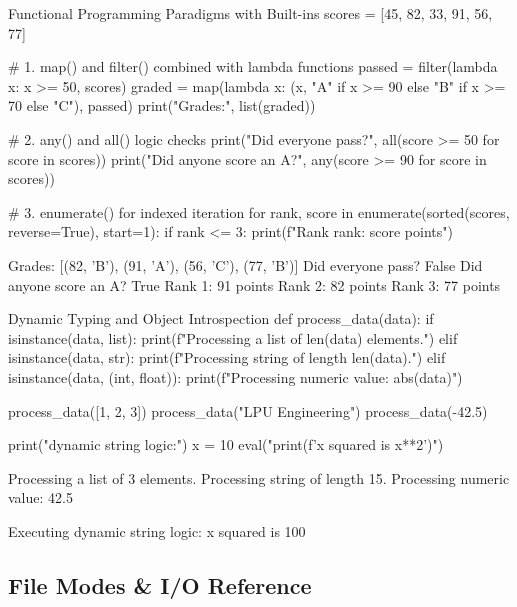 \begin{pythoncode}[]{Functional Programming Paradigms with Built-ins}
scores = [45, 82, 33, 91, 56, 77]

# 1. map() and filter() combined with lambda functions
passed = filter(lambda x: x >= 50, scores)
graded = map(lambda x: (x, "A" if x >= 90 else "B" if x >= 70 else "C"), passed)
print("Grades:", list(graded))

# 2. any() and all() logic checks
print("Did everyone pass?", all(score >= 50 for score in scores))
print("Did anyone score an A?", any(score >= 90 for score in scores))

# 3. enumerate() for indexed iteration
for rank, score in enumerate(sorted(scores, reverse=True), start=1):
    if rank <= 3:
        print(f"Rank {rank}: {score} points")
\end{pythoncode}
\begin{outputbox}
Grades: [(82, 'B'), (91, 'A'), (56, 'C'), (77, 'B')]
Did everyone pass? False
Did anyone score an A? True
Rank 1: 91 points
Rank 2: 82 points
Rank 3: 77 points
\end{outputbox}

\begin{pythoncode}[]{Dynamic Typing and Object Introspection}
def process_data(data):
    if isinstance(data, list):
        print(f"Processing a list of {len(data)} elements.")
    elif isinstance(data, str):
        print(f"Processing string of length {len(data)}.")
    elif isinstance(data, (int, float)):
        print(f"Processing numeric value: {abs(data)}")

process_data([1, 2, 3])
process_data("LPU Engineering")
process_data(-42.5)

print("\nExecuting dynamic string logic:")
x = 10
eval("print(f'x squared is {x**2}')")
\end{pythoncode}
\begin{outputbox}
Processing a list of 3 elements.
Processing string of length 15.
Processing numeric value: 42.5

Executing dynamic string logic:
x squared is 100
\end{outputbox}

\subsection{File Modes \& I/O Reference}

